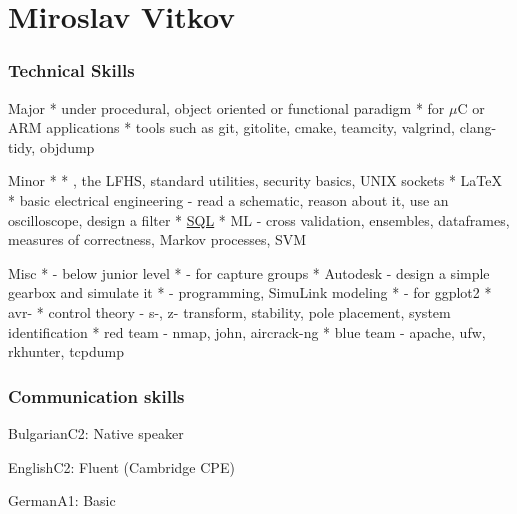 \documentclass{tccv}
\begin{document}


\part{Miroslav Vitkov}


\section{Technical Skills}
\begin{factlist}
\item{Major}
{
     *  under procedural, object oriented or functional paradigm  \mynext
     *  for $\mu$C or ARM applications  \mynext
     * tools such as git, gitolite, cmake, teamcity, valgrind, clang-tidy, objdump
}
\\
\item{Minor}
{
    *   \mynext
    * , the LFHS, standard utilities, security basics, UNIX sockets  \mynext
    * \LaTeX  \mynext
    * basic electrical engineering - read a schematic, reason about it, use an oscilloscope, design a filter  \mynext
    * {\href{https://github.com/MiroslavVitkov/scripts/tree/master/db/init.sh}{SQL}}  \mynext
    * ML - cross validation, ensembles, dataframes, measures of correctness, Markov processes, SVM
}
\\
\item{Misc}
{
    *  - below junior level  \mynext
    *  - for capture groups  \mynext
    * Autodesk  - design a simple gearbox and simulate it  \mynext
    *  - programming, SimuLink modeling  \mynext
    *  - for ggplot2  \mynext
    * avr-  \mynext
    * control theory - s-, z- transform, stability, pole placement, system identification  \mynext
    * red team - nmap, john, aircrack-ng  \mynext
    * blue team - apache, ufw, rkhunter, tcpdump
}
\end{factlist}


\section{Communication skills}
\begin{factlist}
\item{Bulgarian}{C2: Native speaker}
\item{English}{C2: Fluent (Cambridge CPE)}
\item{German}{A1: Basic}
\end{factlist}
\end{document}
